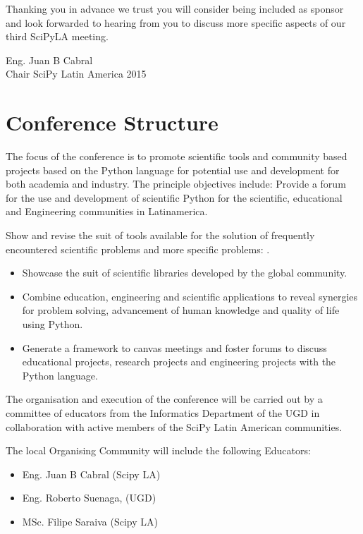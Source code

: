 \documentclass[11pt,a4paper]{report}
\begin{document}
Thanking you in advance we trust you will consider being included as
sponsor and look forwarded to hearing from you to discuss more
specific aspects of our third SciPyLA meeting.\\[0.2cm]

\begin{flushright}
Eng. Juan B Cabral\\
Chair SciPy Latin America 2015 \\

\end{flushright}
\newpage
\section*{Conference Structure}

    The focus of the conference is to promote scientific tools
    and community based projects based on the Python
    language for potential use and development for both academia and
industry. The principle
    objectives include: Provide a forum for the use and development of
    scientific Python for the scientific, educational and Engineering
    communities in Latinamerica.

    Show and revise the suit of tools available for the solution of
    frequently encountered scientific problems and more specific
    problems:
.
  \begin{itemize}
    \item Showcase the suit of scientific libraries developed by the
global community.
    \item Combine education, engineering and scientific applications to reveal
    synergies for problem solving, advancement of human knowledge
    and quality of life using Python.
    \item Generate a framework to canvas meetings and foster forums
    to discuss educational projects, research projects and engineering
    projects with the Python language.
  \end{itemize}

The organisation and execution of the conference will be carried out
by a committee of educators from the Informatics Department of the UGD
in collaboration with active members of the SciPy Latin American
communities.

The local Organising Community will include the following Educators:\\
\begin{itemize}[nolistsep]
    \item Eng. Juan B Cabral (Scipy LA)
    \item Eng. Roberto Suenaga, (UGD)
    \item MSc. Filipe Saraiva (Scipy LA)
\end{itemize}
\end{document}

